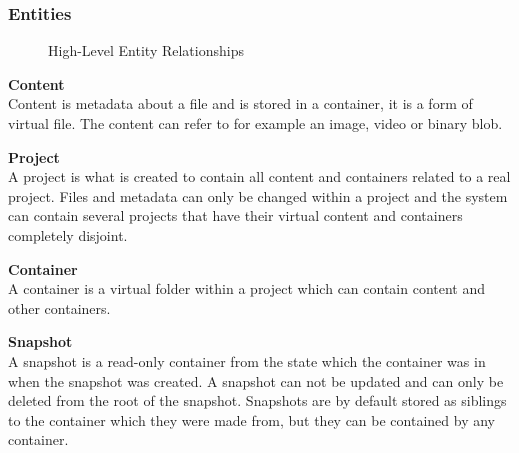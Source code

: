 \documentclass[a4paper,12pt]{article}
\begin{document}
\subsubsection{Entities}
\begin{figure}[H] 
    \caption{High-Level Entity Relationships}
    \label{fig:relation}
\end{figure}

\hfill \par \textbf{Content} \\
Content is metadata about a file and is stored in a container, it is a form of virtual file.  The
content can refer to for example an image, video or binary blob.\\

\par \textbf{Project} \\
A project is what is created to contain all content and containers related to a real project. Files
and metadata can only be changed within a project and the system can contain several projects 
that have their virtual content and containers completely disjoint.\\

\par \textbf{Container} \\
A container is a virtual folder within a project which can contain content and other containers.\\

\par \textbf{Snapshot} \\
A snapshot is a read-only container from the state which the container was in when the snapshot
was created.  A snapshot can not be updated and can only be deleted from the root of the snapshot.
Snapshots are by default stored as siblings to the container which they were made from, but they can
be contained by any container.\\
\end{document}
